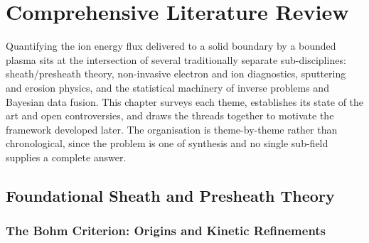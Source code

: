 \chapter{Comprehensive Literature Review}
\label{ch:litreview}

Quantifying the ion energy flux delivered to a solid boundary by a bounded plasma sits at the intersection of several traditionally separate sub-disciplines: sheath/presheath theory, non-invasive electron and ion diagnostics, sputtering and erosion physics, and the statistical machinery of inverse problems and Bayesian data fusion. This chapter surveys each theme, establishes its state of the art and open controversies, and draws the threads together to motivate the framework developed later. The organisation is theme-by-theme rather than chronological, since the problem is one of synthesis and no single sub-field supplies a complete answer.

\section{Foundational Sheath and Presheath Theory}

\subsection{The Bohm Criterion: Origins and Kinetic Refinements}

